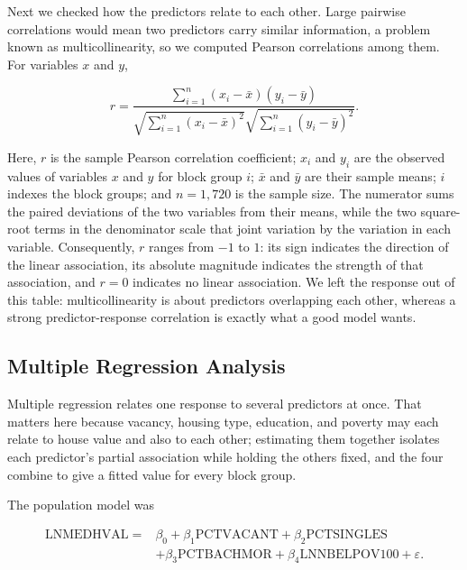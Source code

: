 \documentclass[11pt]{article}
\begin{document}
Next we checked how the predictors relate to each other. Large pairwise correlations would mean two predictors carry similar information, a problem known as multicollinearity, so we computed Pearson correlations among them. For variables $x$ and $y$,

\begin{equation}
r=\frac{\sum_{i=1}^{n}(x_i-\bar{x})(y_i-\bar{y})}
{\sqrt{\sum_{i=1}^{n}(x_i-\bar{x})^2}\sqrt{\sum_{i=1}^{n}(y_i-\bar{y})^2}}.
\end{equation}

Here, $r$ is the sample Pearson correlation coefficient; $x_i$ and $y_i$ are the observed values of variables $x$ and $y$ for block group $i$; $\bar{x}$ and $\bar{y}$ are their sample means; $i$ indexes the block groups; and $n=1{,}720$ is the sample size. The numerator sums the paired deviations of the two variables from their means, while the two square-root terms in the denominator scale that joint variation by the variation in each variable. Consequently, $r$ ranges from $-1$ to $1$: its sign indicates the direction of the linear association, its absolute magnitude indicates the strength of that association, and $r=0$ indicates no linear association. We left the response out of this table: multicollinearity is about predictors overlapping each other, whereas a strong predictor-response correlation is exactly what a good model wants.

\subsection{Multiple Regression Analysis}

Multiple regression relates one response to several predictors at once. That matters here because vacancy, housing type, education, and poverty may each relate to house value and also to each other; estimating them together isolates each predictor's partial association while holding the others fixed, and the four combine to give a fitted value for every block group.

The population model was

\begin{equation}
\begin{aligned}
\mathrm{LNMEDHVAL}={}&\beta_0+\beta_1\mathrm{PCTVACANT}+\beta_2\mathrm{PCTSINGLES}\\
&+\beta_3\mathrm{PCTBACHMOR}+\beta_4\mathrm{LNNBELPOV100}+\varepsilon.
\end{aligned}
\end{equation}
\end{document}
